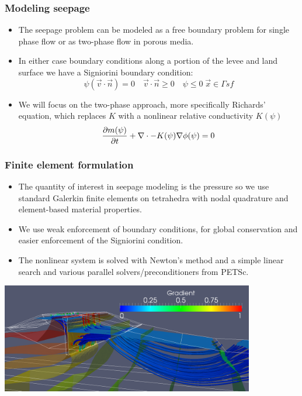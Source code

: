 \documentclass{beamer}
\begin{document}
\begin{frame}
  \frametitle{Modeling seepage}
  \begin{itemize}
    \item The seepage problem can be modeled as a free boundary
      problem for single phase flow or as two-phase flow in porous
      media.
    \item In either case boundary conditions along a portion of the
      levee and land surface we have a Signiorini boundary condition:
      \begin{equation}
\psi(\vec v \cdot \vec n) = 0 \quad \vec v \cdot \vec n \geq 0 \quad
\psi \leq 0 \; \vec x \in \Gamma{sf}
      \end{equation}
    \item We will focus on the two-phase approach, more specifically
      Richards' equation, which replaces $K$ with a nonlinear relative
      conductivity $K(\psi)$
      \begin{equation}
        \frac{\partial {m(\psi)}}{\partial {t}} + \nabla \cdot -K(\psi) \nabla \phi(\psi) = 0 
      \end{equation}
  \end{itemize}
\end{frame}

\begin{frame}
  \frametitle{Finite element formulation}
  \begin{itemize}
  \item The quantity of interest in seepage modeling is the pressure
    so we use standard Galerkin finite elements on tetrahedra with
    nodal quadrature and element-based material properties.
  \item We use weak enforcement of boundary conditions, for global
    conservation and easier enforcement of the Signiorini condition.
  \item The nonlinear system is solved with Newton's method and a
    simple linear search and various parallel solvers/preconditioners
    from PETSc.
  \end{itemize}
\end{frame}

\begin{frame}
\end{frame}

\begin{frame}
\includegraphics[width=4.35in]{pocketLevee_nopipe.png}
\end{frame}
\end{document}
